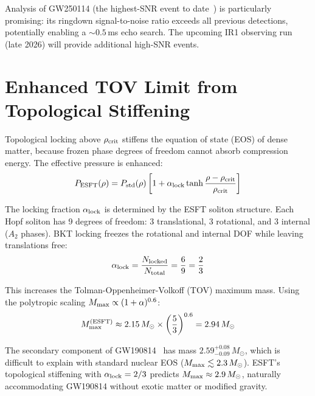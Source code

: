 ﻿\documentclass[twocolumn,preprintnumbers,amsmath,amssymb,prd]{revtex4-2}
\begin{document}
Analysis of GW250114 (the highest-SNR event to date~\cite{LVK2026}) is particularly promising: its ringdown signal-to-noise ratio exceeds all previous detections, potentially enabling a $\sim 0.5\,$ms echo search. The upcoming IR1 observing run (late 2026) will provide additional high-SNR events.

\section{Enhanced TOV Limit from Topological Stiffening}
\label{sec:tov}

Topological locking above $\rho_{\rm crit}$ stiffens the equation of state (EOS) of dense matter, because frozen phase degrees of freedom cannot absorb compression energy. The effective pressure is enhanced:
\begin{equation}
P_{\rm ESFT}(\rho) = P_{\rm std}(\rho)\left[1 + \alpha_{\rm lock}\tanh\frac{\rho - \rho_{\rm crit}}{\rho_{\rm crit}}\right]
\label{eq:eos}
\end{equation}

The locking fraction $\alpha_{\rm lock}$ is determined by the ESFT soliton structure. Each Hopf soliton has 9 degrees of freedom: 3 translational, 3 rotational, and 3 internal ($A_2$ phases). BKT locking freezes the rotational and internal DOF while leaving translations free:
\begin{equation}
\alpha_{\rm lock} = \frac{N_{\rm locked}}{N_{\rm total}} = \frac{6}{9} = \frac{2}{3}
\end{equation}

This increases the Tolman-Oppenheimer-Volkoff (TOV) maximum mass. Using the polytropic scaling $M_{\rm max} \propto (1+\alpha)^{0.6}$:
\begin{equation}
M_{\rm max}^{(\rm ESFT)} \approx 2.15\,M_\odot \times \left(\frac{5}{3}\right)^{0.6} = 2.94\,M_\odot
\end{equation}

The secondary component of GW190814~\cite{GW190814} has mass $2.59^{+0.08}_{-0.09}\,M_\odot$, which is difficult to explain with standard nuclear EOS ($M_{\rm max} \lesssim 2.3\,M_\odot$). ESFT's topological stiffening with $\alpha_{\rm lock} = 2/3$ predicts $M_{\rm max} \approx 2.9\,M_\odot$, naturally accommodating GW190814 without exotic matter or modified gravity.

\end{document}
